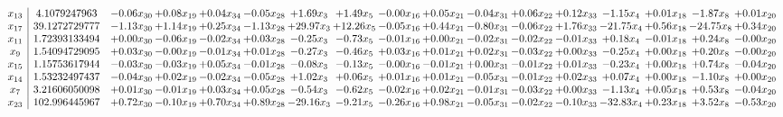 \documentclass[9pt]{article}
\begin{document}
 \[\begin{array}{c| c c@{\hskip 2pt} c@{\hskip 2pt} c@{\hskip 2pt} c@{\hskip 2pt} c@{\hskip 2pt} c@{\hskip 2pt} c@{\hskip 2pt} c@{\hskip 2pt} c@{\hskip 2pt} c@{\hskip 2pt} c@{\hskip 2pt} c@{\hskip 2pt} c@{\hskip 2pt} c@{\hskip 2pt} c@{\hskip 2pt} }
 x_{13}   &  4.1079247963 & -0.06 x_{30} & +  0.08 x_{19} & +  0.04 x_{34} & -0.05 x_{28} & +  1.69 x_{3} & +  1.49 x_{5} & -0.00 x_{16} & +  0.05 x_{21} & -0.04 x_{31} & +  0.06 x_{22} & +  0.12 x_{33} & -1.15 x_{4} & +  0.01 x_{18} & -1.87 x_{8} & +  0.01 x_{20}\\
 x_{17}   &  39.1272729777 & -1.13 x_{30} & +  1.14 x_{19} & +  0.25 x_{34} & -1.13 x_{28} & + 29.97 x_{3} & + 12.26 x_{5} & -0.05 x_{16} & +  0.44 x_{21} & -0.80 x_{31} & -0.06 x_{22} & +  1.76 x_{33} & -21.75 x_{4} & +  0.56 x_{18} & -24.75 x_{8} & +  0.34 x_{20}\\
 x_{11}   &  1.72393133494 & +  0.00 x_{30} & -0.06 x_{19} & -0.02 x_{34} & +  0.03 x_{28} & -0.25 x_{3} & -0.73 x_{5} & -0.01 x_{16} & +  0.00 x_{21} & -0.02 x_{31} & -0.02 x_{22} & -0.01 x_{33} & +  0.18 x_{4} & -0.01 x_{18} & +  0.24 x_{8} & -0.00 x_{20}\\
 x_{9}   &  1.54094729095 & +  0.03 x_{30} & -0.00 x_{19} & -0.01 x_{34} & +  0.01 x_{28} & -0.27 x_{3} & -0.46 x_{5} & +  0.03 x_{16} & +  0.01 x_{21} & +  0.02 x_{31} & -0.03 x_{22} & +  0.00 x_{33} & -0.25 x_{4} & +  0.00 x_{18} & +  0.20 x_{8} & -0.00 x_{20}\\
 x_{15}   &  1.15753617944 & -0.03 x_{30} & -0.03 x_{19} & +  0.05 x_{34} & -0.01 x_{28} & -0.08 x_{3} & -0.13 x_{5} & -0.00 x_{16} & -0.01 x_{21} & +  0.00 x_{31} & -0.01 x_{22} & +  0.01 x_{33} & -0.23 x_{4} & +  0.00 x_{18} & +  0.74 x_{8} & -0.04 x_{20}\\
 x_{14}   &  1.53232497437 & -0.04 x_{30} & +  0.02 x_{19} & -0.02 x_{34} & -0.05 x_{28} & +  1.02 x_{3} & +  0.06 x_{5} & +  0.01 x_{16} & +  0.01 x_{21} & -0.05 x_{31} & -0.01 x_{22} & +  0.02 x_{33} & +  0.07 x_{4} & +  0.00 x_{18} & -1.10 x_{8} & +  0.00 x_{20}\\
 x_{7}   &  3.21606050098 & +  0.01 x_{30} & -0.01 x_{19} & +  0.03 x_{34} & +  0.05 x_{28} & -0.54 x_{3} & -0.62 x_{5} & -0.02 x_{16} & +  0.02 x_{21} & -0.01 x_{31} & -0.03 x_{22} & +  0.00 x_{33} & -1.13 x_{4} & +  0.05 x_{18} & +  0.53 x_{8} & -0.04 x_{20}\\
 x_{23}   &  102.996445967 & +  0.72 x_{30} & -0.10 x_{19} & +  0.70 x_{34} & +  0.89 x_{28} & -29.16 x_{3} & -9.21 x_{5} & -0.26 x_{16} & +  0.98 x_{21} & -0.05 x_{31} & -0.02 x_{22} & -0.10 x_{33} & -32.83 x_{4} & +  0.23 x_{18} & +  3.52 x_{8} & -0.53 x_{20}\\

\end{array}\]
\end{document}
